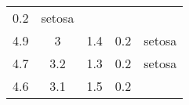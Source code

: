 \documentclass[]{article}
\begin{document}
\begin{longtable}[c]{@{}ccccc@{}}
\begin{minipage}[t]{0.17\columnwidth}\centering\strut
0.2
\strut\end{minipage} &
\begin{minipage}[t]{0.11\columnwidth}\centering\strut
setosa
\strut\end{minipage}\tabularnewline
\begin{minipage}[t]{0.18\columnwidth}\centering\strut
4.9
\strut\end{minipage} &
\begin{minipage}[t]{0.17\columnwidth}\centering\strut
3
\strut\end{minipage} &
\begin{minipage}[t]{0.18\columnwidth}\centering\strut
1.4
\strut\end{minipage} &
\begin{minipage}[t]{0.17\columnwidth}\centering\strut
0.2
\strut\end{minipage} &
\begin{minipage}[t]{0.11\columnwidth}\centering\strut
setosa
\strut\end{minipage}\tabularnewline
\begin{minipage}[t]{0.18\columnwidth}\centering\strut
4.7
\strut\end{minipage} &
\begin{minipage}[t]{0.17\columnwidth}\centering\strut
3.2
\strut\end{minipage} &
\begin{minipage}[t]{0.18\columnwidth}\centering\strut
1.3
\strut\end{minipage} &
\begin{minipage}[t]{0.17\columnwidth}\centering\strut
0.2
\strut\end{minipage} &
\begin{minipage}[t]{0.11\columnwidth}\centering\strut
setosa
\strut\end{minipage}\tabularnewline
\begin{minipage}[t]{0.18\columnwidth}\centering\strut
4.6
\strut\end{minipage} &
\begin{minipage}[t]{0.17\columnwidth}\centering\strut
3.1
\strut\end{minipage} &
\begin{minipage}[t]{0.18\columnwidth}\centering\strut
1.5
\strut\end{minipage} &
\begin{minipage}[t]{0.17\columnwidth}\centering\strut
0.2
\strut\end{minipage} &

\end{longtable}
\end{document}
